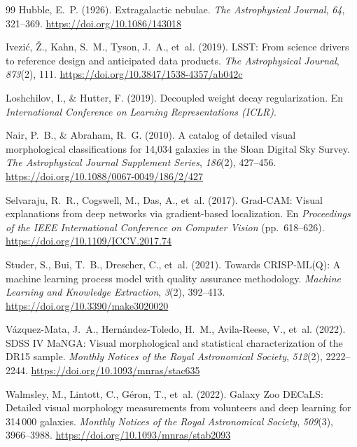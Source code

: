 \begin{thebibliography}{99}
Hubble, E.~P. (1926). Extragalactic nebulae. \emph{The Astrophysical Journal}, \emph{64}, 321--369. \url{https://doi.org/10.1086/143018}

Ivezić, Ž., Kahn, S.~M., Tyson, J.~A., et~al. (2019). LSST: From science drivers to reference design and anticipated data products. \emph{The Astrophysical Journal}, \emph{873}(2), 111. \url{https://doi.org/10.3847/1538-4357/ab042c}

Loshchilov, I., \& Hutter, F. (2019). Decoupled weight decay regularization. En \emph{International Conference on Learning Representations (ICLR)}.

Nair, P.~B., \& Abraham, R.~G. (2010). A catalog of detailed visual morphological classifications for 14,034 galaxies in the Sloan Digital Sky Survey. \emph{The Astrophysical Journal Supplement Series}, \emph{186}(2), 427--456. \url{https://doi.org/10.1088/0067-0049/186/2/427}

Selvaraju, R.~R., Cogswell, M., Das, A., et~al. (2017). Grad-CAM: Visual explanations from deep networks via gradient-based localization. En \emph{Proceedings of the IEEE International Conference on Computer Vision} (pp.~618--626). \url{https://doi.org/10.1109/ICCV.2017.74}

Studer, S., Bui, T.~B., Drescher, C., et~al. (2021). Towards CRISP-ML(Q): A machine learning process model with quality assurance methodology. \emph{Machine Learning and Knowledge Extraction}, \emph{3}(2), 392--413. \url{https://doi.org/10.3390/make3020020}

Vázquez-Mata, J.~A., Hernández-Toledo, H.~M., Avila-Reese, V., et~al. (2022). SDSS IV MaNGA: Visual morphological and statistical characterization of the DR15 sample. \emph{Monthly Notices of the Royal Astronomical Society}, \emph{512}(2), 2222--2244. \url{https://doi.org/10.1093/mnras/stac635}

Walmsley, M., Lintott, C., Géron, T., et~al. (2022). Galaxy Zoo DECaLS: Detailed visual morphology measurements from volunteers and deep learning for 314\,000 galaxies. \emph{Monthly Notices of the Royal Astronomical Society}, \emph{509}(3), 3966--3988. \url{https://doi.org/10.1093/mnras/stab2093}

\end{thebibliography}

